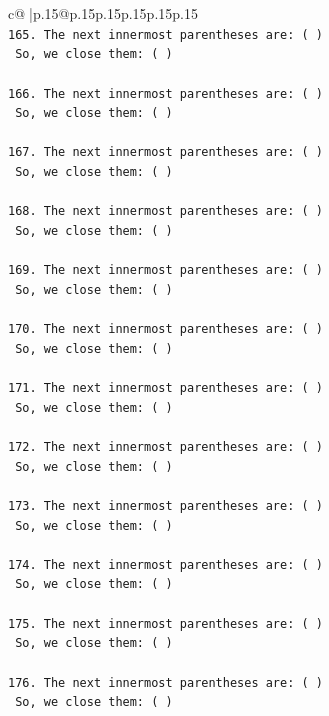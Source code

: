 \documentclass{article}
\begin{document}
{\begin{supertabular}{c@{$\;$}|p{.15\linewidth}@{}p{.15\linewidth}p{.15\linewidth}p{.15\linewidth}p{.15\linewidth}p{.15\linewidth}}
{{{\\ 
\texttt{165. The next innermost parentheses are: ( ) } \\
\texttt{    So, we close them: ( ) } \\
\\ 
\texttt{166. The next innermost parentheses are: ( ) } \\
\texttt{    So, we close them: ( ) } \\
\\ 
\texttt{167. The next innermost parentheses are: ( ) } \\
\texttt{    So, we close them: ( ) } \\
\\ 
\texttt{168. The next innermost parentheses are: ( ) } \\
\texttt{    So, we close them: ( ) } \\
\\ 
\texttt{169. The next innermost parentheses are: ( ) } \\
\texttt{    So, we close them: ( ) } \\
\\ 
\texttt{170. The next innermost parentheses are: ( ) } \\
\texttt{    So, we close them: ( ) } \\
\\ 
\texttt{171. The next innermost parentheses are: ( ) } \\
\texttt{    So, we close them: ( ) } \\
\\ 
\texttt{172. The next innermost parentheses are: ( ) } \\
\texttt{    So, we close them: ( ) } \\
\\ 
\texttt{173. The next innermost parentheses are: ( ) } \\
\texttt{    So, we close them: ( ) } \\
\\ 
\texttt{174. The next innermost parentheses are: ( ) } \\
\texttt{    So, we close them: ( ) } \\
\\ 
\texttt{175. The next innermost parentheses are: ( ) } \\
\texttt{    So, we close them: ( ) } \\
\\ 
\texttt{176. The next innermost parentheses are: ( ) } \\
\texttt{    So, we close them: ( ) } \\
}}}
\end{supertabular}}
\end{document}
